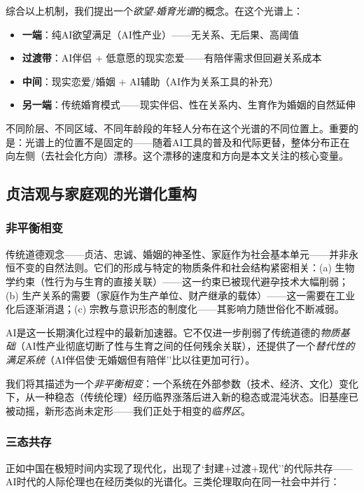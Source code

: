 \documentclass[12pt,a4paper]{ctexart}
\begin{document}
综合以上机制，我们提出一个\emph{欲望-婚育光谱}的概念。在这个光谱上：
\begin{itemize}
\item \textbf{一端}：纯AI欲望满足（AI性产业）——无关系、无后果、高阈值
\item \textbf{过渡带}：AI伴侣 + 低意愿的现实恋爱——有陪伴需求但回避关系成本
\item \textbf{中间}：现实恋爱/婚姻 + AI辅助（AI作为关系工具的补充）
\item \textbf{另一端}：传统婚育模式——现实伴侣、性在关系内、生育作为婚姻的自然延伸
\end{itemize}

不同阶层、不同区域、不同年龄段的年轻人分布在这个光谱的不同位置上。重要的是：光谱上的位置不是固定的——随着AI工具的普及和代际更替，整体分布正在向左侧（去社会化方向）漂移。这个漂移的速度和方向是本文关注的核心变量。

\subsection{贞洁观与家庭观的光谱化重构}

\subsubsection{非平衡相变}

传统道德观念——贞洁、忠诚、婚姻的神圣性、家庭作为社会基本单元——并非永恒不变的自然法则。它们的形成与特定的物质条件和社会结构紧密相关：(a) 生物学约束（性行为与生育的直接关联）——这一约束已被现代避孕技术大幅削弱；(b) 生产关系的需要（家庭作为生产单位、财产继承的载体）——这一需要在工业化后逐渐消退；(c) 宗教与意识形态的制度化——其影响力随世俗化不断减弱。

AI是这一长期演化过程中的最新加速器。它不仅进一步削弱了传统道德的\emph{物质基础}（AI性产业彻底切断了性与生育之间的任何残余关联），还提供了一个\emph{替代性的满足系统}（AI伴侣使`无婚姻但有陪伴''比以往更加可行）。

我们将其描述为一个\textit{非平衡相变}：一个系统在外部参数（技术、经济、文化）变化下，从一种稳态（传统伦理）经历临界涨落后进入新的稳态或混沌状态。旧基座已被动摇，新形态尚未定形——我们正处于相变的\textit{临界区}。

\subsubsection{三态共存}

正如中国在极短时间内实现了现代化，出现了`封建+过渡+现代''的代际共存——AI时代的人际伦理也在经历类似的光谱化。三类伦理取向在同一社会中并行：
\end{document}
